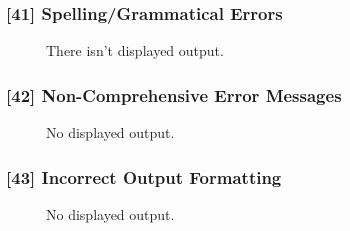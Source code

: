 \subsubsection{[41] Spelling/Grammatical Errors}
\begin{description}
	\item[] There isn't displayed output.
\end{description}

\subsubsection{[42] Non-Comprehensive Error Messages}
\begin{description}
	\item[] No displayed output.
\end{description}

\subsubsection{[43] Incorrect Output Formatting}
\begin{description}
	\item[] No displayed output.
\end{description}